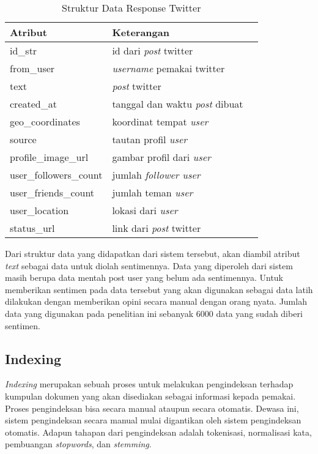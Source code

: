 \begin{table}[hbt]
	\caption{Struktur Data Response Twitter}
	\centering
	\begin{tabular}{llr}
		
		\cmidrule(r){1-2}
		Atribut & Keterangan \\
		\midrule
		id\_str & id dari \textit{post} twitter \\
		from\_user & \textit{username} pemakai twitter \\
		text & \textit{post} twitter \\
		created\_at & tanggal dan waktu \textit{post} dibuat \\
		geo\_coordinates & koordinat tempat \textit{user} \\
		source & tautan profil \textit{user} \\
		profile\_image\_url & gambar profil dari \textit{user} \\
		user\_followers\_count & jumlah \textit{follower user} \\
		user\_friends\_count & jumlah teman \textit{user} \\
		user\_location & lokasi dari \textit{user} \\
		status\_url & link dari \textit{post} twitter \\
		
		\bottomrule
	\end{tabular}
	\label{tab:strukturdatatwitter}
\end{table}

Dari struktur data yang didapatkan dari sistem tersebut, akan diambil atribut \textit{text} sebagai data untuk diolah sentimennya. Data yang diperoleh dari sistem masih berupa data mentah post user yang belum ada sentimennya. Untuk memberikan sentimen pada data tersebut yang akan digunakan sebagai data latih dilakukan dengan memberikan opini secara manual dengan orang nyata. Jumlah data yang digunakan pada penelitian ini sebanyak 6000 data yang sudah diberi sentimen. 

\subsection*{Indexing}

\textit{Indexing} merupakan sebuah proses untuk melakukan pengindeksan terhadap kumpulan dokumen yang akan disediakan sebagai informasi kepada pemakai. Proses pengindeksan bisa secara  manual ataupun secara otomatis. Dewasa ini, sistem pengindeksan secara manual mulai digantikan oleh sistem pengindeksan otomatis. Adapun tahapan dari pengindeksan adalah tokenisasi, normalisasi kata, pembuangan \textit{stopwords}, dan \textit{stemming}.

